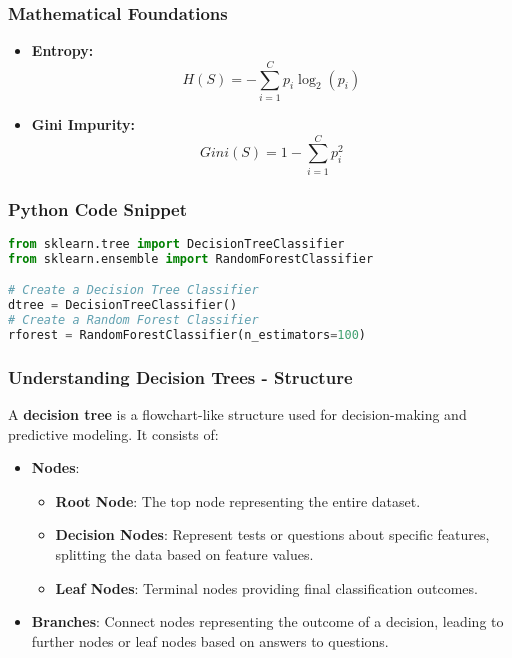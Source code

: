 \documentclass[aspectratio=169]{beamer}
\begin{document}
\begin{frame}[fragile]
    \frametitle{Mathematical Foundations}
    \begin{itemize}
        \item \textbf{Entropy:} 
        \begin{equation}
            H(S) = -\sum_{i=1}^{C} p_i \log_2(p_i)
        \end{equation}
        \item \textbf{Gini Impurity:} 
        \begin{equation}
            Gini(S) = 1 - \sum_{i=1}^{C} p_i^2
        \end{equation}
    \end{itemize}
\end{frame}

\begin{frame}[fragile]
    \frametitle{Python Code Snippet}
    \begin{lstlisting}[language=Python]
from sklearn.tree import DecisionTreeClassifier
from sklearn.ensemble import RandomForestClassifier

# Create a Decision Tree Classifier
dtree = DecisionTreeClassifier()
# Create a Random Forest Classifier
rforest = RandomForestClassifier(n_estimators=100)
    \end{lstlisting}
\end{frame}

\begin{frame}[fragile]
    \frametitle{Understanding Decision Trees - Structure}
    A \textbf{decision tree} is a flowchart-like structure used for decision-making and predictive modeling. It consists of:
    
    \begin{itemize}
        \item \textbf{Nodes}:
        \begin{itemize}
            \item \textbf{Root Node}: The top node representing the entire dataset.
            \item \textbf{Decision Nodes}: Represent tests or questions about specific features, splitting the data based on feature values.
            \item \textbf{Leaf Nodes}: Terminal nodes providing final classification outcomes.
        \end{itemize}
        
        \item \textbf{Branches}: Connect nodes representing the outcome of a decision, leading to further nodes or leaf nodes based on answers to questions.
    \end{itemize}
\end{frame}
\end{document}
